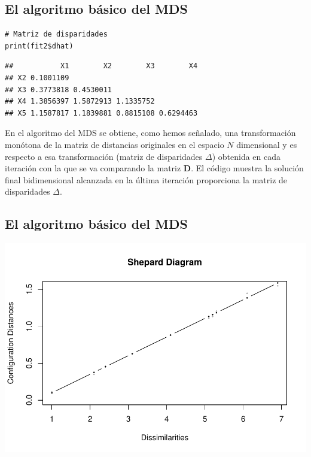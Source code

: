 \documentclass[]{article}
\begin{document}
\subsection{El algoritmo básico del
MDS}\label{el-algoritmo-buxe1sico-del-mds-3}

\hypertarget{left}{}
\begin{verbatim}
# Matriz de disparidades
print(fit2$dhat)
\end{verbatim}

\begin{verbatim}
##           X1        X2        X3        X4
## X2 0.1001109                              
## X3 0.3773818 0.4530011                    
## X4 1.3856397 1.5872913 1.1335752          
## X5 1.1587817 1.1839881 0.8815108 0.6294463
\end{verbatim}

\hypertarget{right}{}
En el algoritmo del MDS se obtiene, como hemos señalado, una
{transformación monótona de la matriz de distancias originales en el
espacio \(N\) dimensional} y es respecto a esa {transformación (matriz
de disparidades \(\Delta\))} obtenida en {cada iteración} con la que {se
va comparando la matriz \(\textbf{D}\)}. El código muestra la {solución
final bidimensional} alcanzada en la {última iteración proporciona la
matriz de disparidades \(\Delta\)}.

\subsection{El algoritmo básico del
MDS}\label{el-algoritmo-buxe1sico-del-mds-4}

\hypertarget{left}{}
\includegraphics{Clase-4_files/figure-latex/unnamed-chunk-8-1.pdf}
\end{document}
